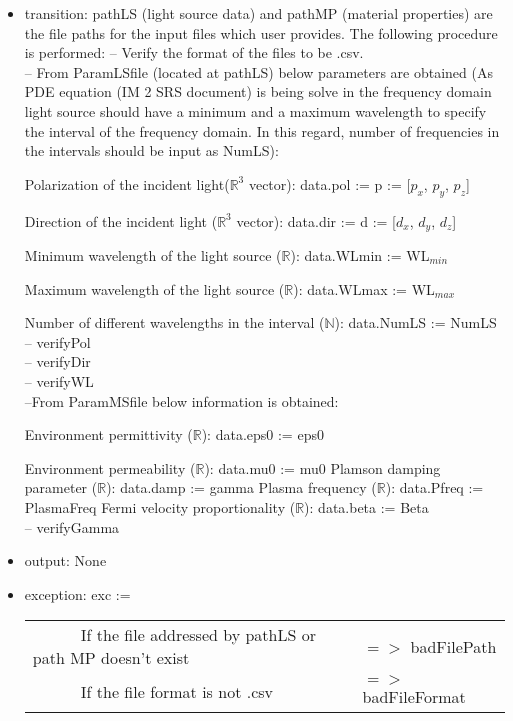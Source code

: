 \documentclass[12pt, titlepage]{article}
\begin{document}
	\begin{itemize} \item transition: pathLS (light source data) and pathMP
		(material properties) are the file paths for the input files which user
		provides. The following procedure is performed: \subitem -- Verify the format of
		the files to be .csv.\\ \subitem -- From ParamLSfile (located at pathLS) below
		parameters are obtained (As PDE equation (IM 2 SRS document) is being solve in
		the frequency domain light source should have a minimum and a maximum wavelength
		to specify the interval of the frequency domain. In this regard, number of
		frequencies in the intervals should be input as NumLS):
		
		\subsubitem Polarization of the incident light($\mathbb{R}^3$ vector): data.pol
		:= p := [$p_x$, $p_y$, $p_z$]
		
		\subsubitem Direction of the incident light ($\mathbb{R}^3$ vector): data.dir
		:= d := [$d_x$, $d_y$, $d_z$]
		
		
		\subsubitem Minimum wavelength of the light source ($\mathbb{R}$): data.WLmin
		:= WL$_{min}$
		
		\subsubitem Maximum wavelength of the light source ($\mathbb{R}$): data.WLmax
		:= WL$_{max}$
		
		\subsubitem Number of different wavelengths in the interval ($\mathbb{N}$):
		data.NumLS := NumLS \\
		
		\subitem -- verifyPol\\ \subitem -- verifyDir\\ \subitem -- verifyWL\\
		
		
		\subitem --From ParamMSfile below information is obtained:
		
		\subsubitem Environment permittivity ($\mathbb{R}$): data.eps0 := eps0
		
		\subsubitem Environment permeability ($\mathbb{R}$): data.mu0 := mu0
		\subsubitem Plamson damping parameter ($\mathbb{R}$): data.damp := gamma
		\subsubitem Plasma frequency ($\mathbb{R}$): data.Pfreq := PlasmaFreq
		\subsubitem Fermi velocity proportionality ($\mathbb{R}$): data.beta := Beta\\
		
		\subitem -- verifyGamma\\ \item output: None
		
		\item exception: exc :=\  \noindent \begin{longtable*}[l]{l l} \ \ \ \ \ \ If the file
			addressed by pathLS or path MP doesn't exist & $=>$ badFilePath\\ \ \ \ \ \ \
			If the file format is not .csv & $=>$ badFileFormat\\ \end{longtable*}
		
	\end{itemize}
	
\end{document}
